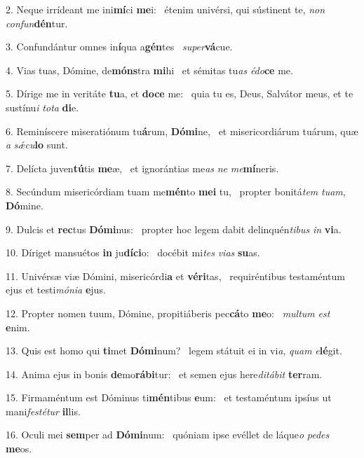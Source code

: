 2. Neque irrídeant me ini\textbf{mí}ci \textbf{me}i: \ast\  étenim univérsi, qui sústinent te, \textit{non} \textit{con}\textit{fun}\textbf{dén}tur.\

3. Confundántur omnes in\textbf{í}qua a\textbf{gén}tes \ast\  \textit{su}\textit{per}\textbf{vá}cue.\

4. Vias tuas, Dómine, de\textbf{móns}tra \textbf{mi}hi \ast\  et sémitas tu\textit{as} \textit{é}\textit{do}\textbf{ce} me.\

5. Dírige me in veritáte \textbf{tu}a, et \textbf{do}\textbf{ce} me: \ast\  quia tu es, Deus, Salvátor meus, et te sustínu\textit{i} \textit{to}\textit{ta} \textbf{di}e.\

6. Reminíscere miseratiónum tu\textbf{á}rum, \textbf{Dó}\textbf{mi}ne, \ast\  et misericordiárum tuárum, quæ \textit{a} \textit{sǽ}\textit{cu}\textbf{lo} sunt.\

7. Delícta juven\textbf{tú}tis \textbf{me}æ, \ast\  et ignorántias me\textit{as} \textit{ne} \textit{me}\textbf{mí}neris.\

8. Secúndum misericórdiam tuam me\textbf{mén}to \textbf{me}\textbf{i} tu, \ast\  propter bonitá\textit{tem} \textit{tu}\textit{am}, \textbf{Dó}mine.\

9. Dulcis et \textbf{rec}tus \textbf{Dó}\textbf{mi}nus: \ast\  propter hoc legem dabit delinquén\textit{ti}\textit{bus} \textit{in} \textbf{vi}a.\

10. Díriget mansuétos \textbf{in} ju\textbf{dí}\textbf{ci}o: \ast\  docébit mi\textit{tes} \textit{vi}\textit{as} \textbf{su}as.\

11. Univérsæ viæ Dómini, misericórdi\textbf{a} et \textbf{vé}\textbf{ri}tas, \ast\  requiréntibus testaméntum ejus et testi\textit{mó}\textit{ni}\textit{a} \textbf{e}jus.\

12. Propter nomen tuum, Dómine, propitiáberis pec\textbf{cá}to \textbf{me}o: \ast\  \textit{mul}\textit{tum} \textit{est} \textbf{e}nim.\

13. Quis est homo qui \textbf{ti}met \textbf{Dó}\textbf{mi}num? \ast\  legem státuit ei in vi\textit{a}, \textit{quam} \textit{e}\textbf{lé}git.\

14. Anima ejus in bonis \textbf{de}mo\textbf{rá}\textbf{bi}tur: \ast\  et semen ejus here\textit{di}\textit{tá}\textit{bit} \textbf{ter}ram.\

15. Firmaméntum est Dóminus ti\textbf{mén}tibus \textbf{e}um: \ast\  et testaméntum ipsíus ut mani\textit{fes}\textit{té}\textit{tur} \textbf{il}lis.\

16. Oculi mei \textbf{sem}per ad \textbf{Dó}\textbf{mi}num: \ast\  quóniam ipse evéllet de láque\textit{o} \textit{pe}\textit{des} \textbf{me}os.\


